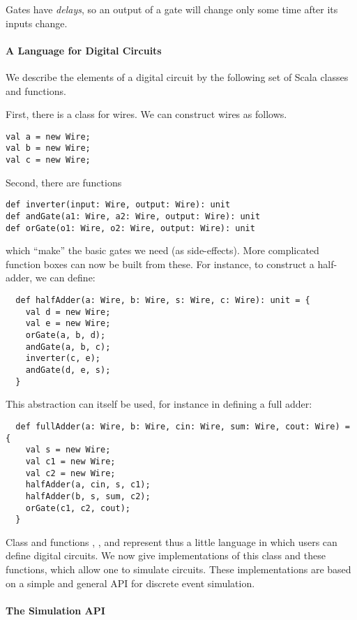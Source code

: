 {Gates have {\em delays}, so an output of a gate will change only some
time after its inputs change.

\paragraph{A Language for Digital Circuits}

We describe the elements of a digital circuit by the following set of
Scala classes and functions.

First, there is a class  for wires.
We can construct wires as follows.
\begin{lstlisting}
val a = new Wire;
val b = new Wire;
val c = new Wire;
\end{lstlisting}
Second, there are functions
\begin{lstlisting}
def inverter(input: Wire, output: Wire): unit
def andGate(a1: Wire, a2: Wire, output: Wire): unit
def orGate(o1: Wire, o2: Wire, output: Wire): unit
\end{lstlisting}
which ``make'' the basic gates we need (as side-effects).
More complicated function boxes can now be built from these.
For instance, to construct a half-adder, we can define:

\begin{lstlisting}
  def halfAdder(a: Wire, b: Wire, s: Wire, c: Wire): unit = {
    val d = new Wire;
    val e = new Wire;
    orGate(a, b, d);
    andGate(a, b, c);
    inverter(c, e);
    andGate(d, e, s);
  }
\end{lstlisting}
This abstraction can itself be used, for instance in defining a full
adder:
\begin{lstlisting}
  def fullAdder(a: Wire, b: Wire, cin: Wire, sum: Wire, cout: Wire) = {
    val s = new Wire;
    val c1 = new Wire;
    val c2 = new Wire;
    halfAdder(a, cin, s, c1);
    halfAdder(b, s, sum, c2);
    orGate(c1, c2, cout);
  }
\end{lstlisting}
Class  and functions , , and
 represent thus a little language in which users can
define digital circuits.  We now give implementations of this class
and these functions, which allow one to simulate circuits.
These implementations are based on a simple and general API for
discrete event simulation.

\paragraph{The Simulation API}

}
